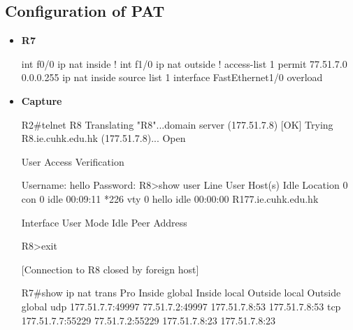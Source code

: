 \documentclass[10pt]{article}
\begin{document}
\subsection{Configuration of PAT}
\begin{itemize}
\item {\bf R7}
\begin{verbatim*}
int f0/0
 ip nat inside
!
int f1/0
 ip nat outside
!
access-list 1 permit 77.51.7.0 0.0.0.255
ip nat inside source list 1 interface FastEthernet1/0 overload
\end{verbatim*}
\item {\bf Capture}
\begin{verbatim*}
R2#telnet R8
Translating "R8"...domain server (177.51.7.8) [OK]
Trying R8.ie.cuhk.edu.hk (177.51.7.8)... Open


User Access Verification

Username: hello
Password:
R8>show user
Line       User       Host(s)              Idle       Location
0 con 0                idle                 00:09:11
*226 vty 0     hello      idle                 00:00:00 R177.ie.cuhk.edu.hk

Interface    User               Mode         Idle     Peer Address

R8>exit

[Connection to R8 closed by foreign host]


R7#show ip nat trans
Pro Inside global      Inside local       Outside local      Outside global
udp 177.51.7.7:49997   77.51.7.2:49997    177.51.7.8:53      177.51.7.8:53
tcp 177.51.7.7:55229   77.51.7.2:55229    177.51.7.8:23      177.51.7.8:23
\end{verbatim*}
\end{itemize}
\end{document}
